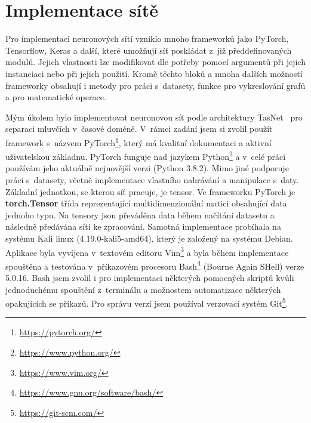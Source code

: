 


\chapter{Implementace sítě}
\label{implementace}
Pro implementaci neuronových sítí vzniklo mnoho frameworků jako PyTorch, Tensorflow, Keras a další, které umožňují síť poskládat z~již předdefinovaných modulů. Jejich vlastnosti lze modifikovat dle potřeby pomocí argumentů při jejich instanciaci nebo při jejich použití. Kromě těchto bloků a mnoha dalších možností frameworky obsahují i metody pro práci s~datasety, funkce pro vykreslování grafů a pro matematické operace.

Mým úkolem bylo implementovat neuronovou síť podle architektury TasNet~\cite{luo2018convtasnet} pro separaci mluvčích v~časové doméně. V~rámci zadání jsem si zvolil použít framework s~názvem PyTorch\footnote{\url{https://pytorch.org/}}, který má kvalitní dokumentaci a aktivní uživatelskou základnu. PyTorch funguje nad jazykem Python\footnote{\url{https://www.python.org/}} a v~celé práci používám jeho aktuálně nejnovější verzi (Python 3.8.2). Mimo jiné podporuje práci s~datasety, včetně implementace vlastního nahrávání a manipulace s~daty. Základní jednotkou, se kterou síť pracuje, je tensor. Ve frameworku PyTorch je \textbf{torch.Tensor} třída reprezentující multidimenzionální matici obsahující data jednoho typu. Na tensory jsou převáděna data během načítání datasetu a následně předávána síti ke zpracování. Samotná implementace probíhala na systému Kali linux (4.19.0-kali5-amd64), který je založený na systému Debian. Aplikace byla vyvíjena v~textovém editoru Vim\footnote{\url{https://www.vim.org/}} a byla během implementace spouštěna a testována v~příkazovém procesoru Bash\footnote{\url{https://www.gnu.org/software/bash/}} (Bourne Again SHell) verze 5.0.16. Bash jsem zvolil i pro implementaci některých pomocných skriptů kvůli jednoduchému spouštění z~terminálu a možnostem automatizace některých opakujících se příkazů. Pro správu verzí jsem používal verzovací systém Git\footnote{\url{https://git-scm.com/}}.

